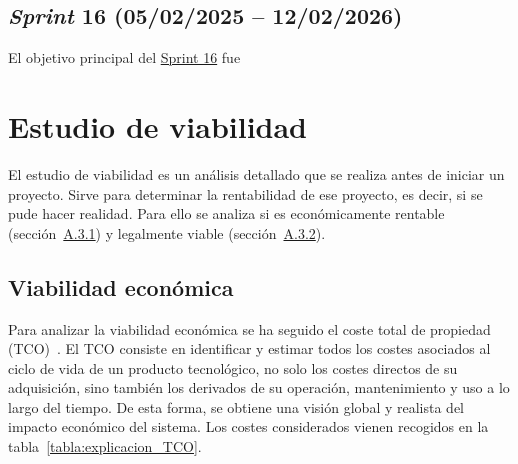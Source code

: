 \subsection{\textit{Sprint} 16 (05/02/2025 -- 12/02/2026)}
El objetivo principal del \href{https://github.com/lbr1014/TFG_RAG/milestone/16?closed=1}{Sprint 16} fue

\section{Estudio de viabilidad}
El estudio de viabilidad es un análisis detallado que se realiza antes de iniciar un proyecto. Sirve para determinar la rentabilidad de ese proyecto, es decir, si se pude hacer realidad. Para ello se analiza si es económicamente rentable (sección~\hyperref[viabilidad_economica]{A.3.1}) y legalmente viable (sección~\hyperref[viabilidad_legal]{A.3.2}). 

\subsection{Viabilidad económica}\label{viabilidad_economica}
Para analizar la viabilidad económica se ha seguido el coste total de propiedad (TCO)~\cite{book:TCO_costs}. El TCO consiste en identificar y estimar todos los costes asociados al ciclo de vida de un producto tecnológico, no solo los costes directos de su adquisición, sino también los derivados de su operación, mantenimiento y uso a lo largo del tiempo. De esta forma, se obtiene una visión global y realista del impacto económico del sistema. Los costes considerados vienen recogidos en la tabla~\ref{tabla:explicacion_TCO}.

